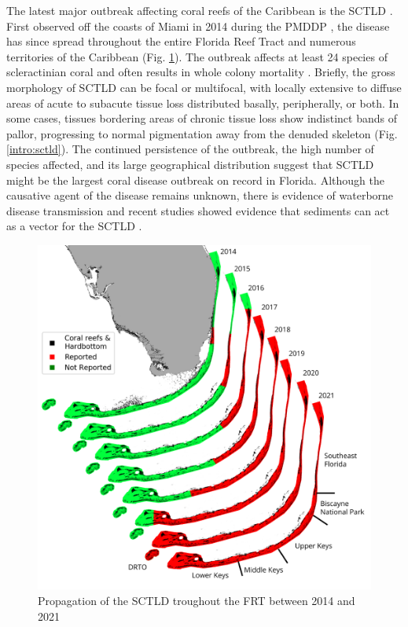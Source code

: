 The latest major outbreak affecting coral reefs of the Caribbean is the SCTLD \citep{noaa2018}. First observed off the coasts of Miami in 2014 during the PMDDP \citep{precht2016unprecedented}, the disease has since spread throughout the entire Florida Reef Tract and numerous territories of the Caribbean \citep{alvarez2019rapid, kramer2019map, estrada2021effects} (Fig. \ref{intro:propagation}). The outbreak affects at least 24 species of scleractinian coral and often results in whole colony mortality \citep{precht2016unprecedented, walton2018impacts}. Briefly, the gross morphology of SCTLD can be focal or multifocal, with locally extensive to diffuse areas of acute to subacute tissue loss distributed basally, peripherally, or both. In some cases, tissues bordering areas of chronic tissue loss show indistinct bands of pallor, progressing to normal pigmentation away from the denuded skeleton (Fig. \ref{intro:sctld}). The continued persistence of the outbreak, the high number of species affected, and its large geographical distribution suggest that SCTLD might be the largest coral disease outbreak on record in Florida. Although the causative agent of the disease remains unknown, there is evidence of waterborne disease transmission \citep{aeby2019pathogenesis,eaton2021measuring,meiling2021variable} and recent studies showed evidence that sediments can act as a vector for the SCTLD \citep{rosales2020rhodobacterales, studivan2022reef}. 

\begin{figure}
    \centering
    \includegraphics[width=\textwidth]{chapters/intro/figures/fig_sctld.png}
    \caption{Propagation of the SCTLD troughout the FRT between 2014 and 2021}
    \label{intro:propagation}
\end{figure}

